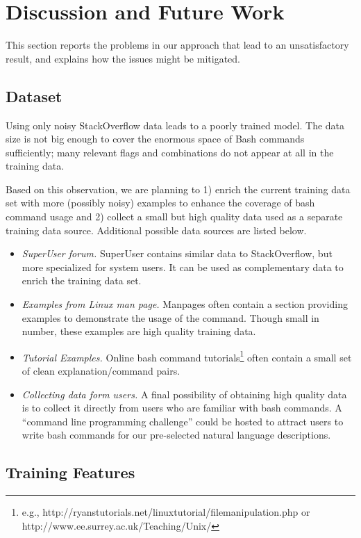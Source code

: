 \section{Discussion and Future Work}

This section reports the problems in our approach that lead to an unsatisfactory result, and explains how the issues might be mitigated.

\subsection{Dataset}

Using only noisy StackOverflow data leads to a poorly trained model. The data size is not big enough to cover the enormous space of Bash commands sufficiently; many relevant flags and combinations do not appear at all in the training data.

Based on this observation, we are planning to 1) enrich the current training data set with more (possibly noisy) examples to enhance the coverage of bash command usage and 2) collect a small but high quality data used as a separate training data source. Additional possible data sources are listed below.
\begin{itemize}\itemsep-1pt
\item \textit{SuperUser forum.} SuperUser contains similar data to StackOverflow, but more specialized for system users. It can be used as complementary data to enrich the training data set.
\item \textit{Examples from Linux man page.} Manpages often contain a section providing examples to demonstrate the usage of the command. Though small in number, these examples are high quality training data.
\item \textit{Tutorial Examples.} Online bash command tutorials\footnote{e.g., http://ryanstutorials.net/linuxtutorial/filemanipulation.php or http://www.ee.surrey.ac.uk/Teaching/Unix/} often contain a small set of clean explanation/command pairs.
\item \textit{Collecting data form users.} A final possibility of obtaining high quality data is to collect it directly from users who are familiar with bash commands. A ``command line programming challenge'' could be hosted to attract users to write bash commands for our pre-selected natural language descriptions.
\end{itemize}

\subsection{Training Features}
\label{future:features}

